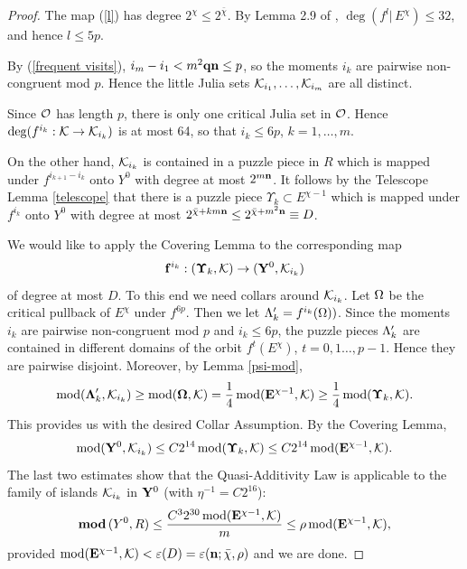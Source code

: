 \begin{proof}
The map (\ref{l})
has degree  $2^\chi\leq 2^{\bar\chi}$. By Lemma 2.9 of \cite{KL-high}, 
 $\deg (f^l |\, E^\chi)\leq 32$,  and hence $l\leq 5p$.


 By (\ref{frequent visits}),   $i_m-i_1 < m^2 {\mathbf{q}} {\mathbf{n}} \leq p $,
so the moments $i_k$ are pairwise non-congruent mod $p$.
Hence the little Julia sets ${\mathcal K}_{i_1}, \dots, {\mathcal K}_{i_m}$
are all distinct.

Since ${\mathcal O}$ has length $p$, there is only one critical Julia set in ${\mathcal O}$.
Hence $\deg(f^{i_k}: {\mathcal K}\rightarrow {\mathcal K}_{i_k}) $ is at most 64, so that $i_k\leq 6p$,
$k=1,\dots, m$.

On the other hand, ${\mathcal K}_{i_k}$ is contained  in  a puzzle piece in $R$
which is mapped under $f^{i_{k+1}-i_k}$ onto $Y^0$ with degree at most $2^{m{\mathbf{n}}}$. 
It follows by the Telescope Lemma \ref{telescope} that there is a puzzle piece $\Upsilon_k\subset E^{\chi-1}$
which is mapped under $f^{i_k}$ onto $Y^0$ with degree at most $2^{\bar\chi+km{\mathbf{n}}}\leq 2^{\bar\chi + m^2{\mathbf{n}}}\equiv D$.

We would like to apply the Covering Lemma to the corresponding map
$$
   {\bf f}^{i_k}: (\boldsymbol{\Upsilon}_k, {\mathcal K})\rightarrow  ({\mathbf{Y}}^0, {\mathcal K}_{i_k})
$$
of degree at most $D$.
To this end we need collars around ${\mathcal K}_{i_k}$.
Let ${\Omega}$ be the critical pullback of  $E^\chi$ under $f^{6p}$.
 Then we let ${\Lambda}_k' = f^{i_k}({\Omega}))$.
Since the moments $i_k$ are pairwise non-congruent mod $p$ and $i_k\leq 6p$,
 the puzzle pieces ${\Lambda}_k'$ are contained in different domains of the orbit
$f^t(E^\chi)$, $t=0,1\dots, p-1$. Hence they are pairwise disjoint.
Moreover, by Lemma \ref{psi-mod},
\begin{equation}\label{collars again}
  \operatorname{mod}({\boldsymbol{{\Lambda}}}_k', {\mathcal K}_{i_k})\geq  \operatorname{mod}(\boldsymbol{{\Omega}}, {\mathcal K})= \frac{1}{4} \operatorname{mod}({\mathbf{E}}^{\chi-1}, {\mathcal K}) \geq  \frac{1}{4} \operatorname{mod}({\boldsymbol{\Upsilon}}_k, {\mathcal K}).
\end{equation}
This provides us with the desired Collar Assumption.
  By the Covering Lemma,
$$
  \operatorname{mod}({\mathbf{Y}}^0,{\mathcal K}_{i_k})\leq C 2^{14} \operatorname{mod}({\boldsymbol{\Upsilon}}_k, {\mathcal K})\leq C 2^{14} \operatorname{mod}({\mathbf{E}}^{\chi-1}, {\mathcal K}) .
$$
The last two estimates show that
the Quasi-Additivity Law is applicable to the family of islands ${\mathcal K}_{i_k}$ in ${\mathbf{Y}}^0$
(with $\eta^{-1}= C2^{16}$):
$$
   { \mathbf{mod}\, } (Y^0, R) \leq \frac{C^3 2^{30} \operatorname{mod}({\mathbf{E}}^{\chi-1}, {\mathcal K})}{m}\leq \rho \operatorname{mod}({\mathbf{E}}^{\chi-1}, {\mathcal K}),
$$
provided $\operatorname{mod}({\mathbf{E}}^{\chi-1}, {\mathcal K})< {\varepsilon}(D) = {\varepsilon}({\mathbf{n}}; \bar\chi, \rho)$
and we are done.
\end{proof}

